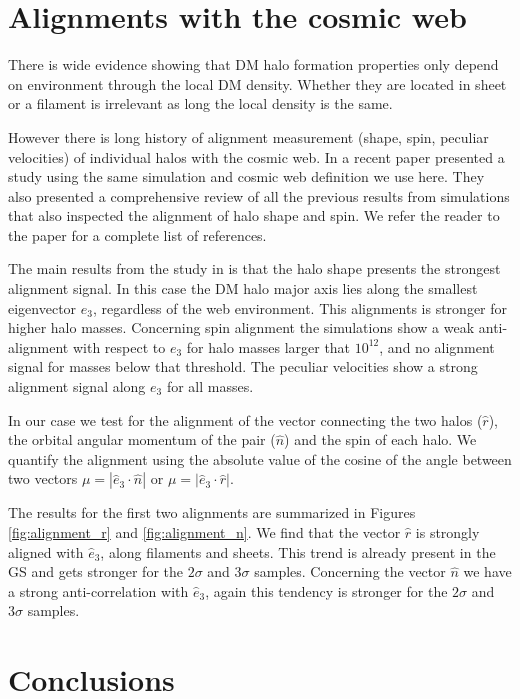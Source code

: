\documentclass{iau}
\newcommand{\Msun}{{\ifmmode{{\rm {M_{\odot}}}}\else{${\rm{M_{\odot}}}$}\fi}}
\begin{document}
\section{Alignments with the cosmic web}

There is wide evidence showing that DM halo formation properties only
depend on environment through the local DM density. Whether they are
located in sheet or a filament is irrelevant as long the local density
is the same. 

However there is long history of alignment measurement (shape, spin,
peculiar velocities) of individual halos with the cosmic web. In a
recent paper \cite{ForeroRomero2014} presented a study
using the same simulation and cosmic web definition we use here.
They also presented a comprehensive review of all the previous results
from simulations that also inspected the alignment of halo shape and
spin. We refer the reader to the paper for a complete list of
references. 

The main results from the study in \cite{ForeroRomero2014} is that the
halo shape presents the strongest alignment signal. In this case the
DM halo major axis lies along the smallest eigenvector $e_{3}$,
regardless of the web environment. This alignments is stronger for
higher halo masses. Concerning spin alignment the simulations show a
weak anti-alignment with respect to $e_{3}$ for halo masses larger
that $10^{12}$\Msun, and no alignment signal for masses below that
threshold. The peculiar velocities show a strong alignment signal
along $e_{3}$ for all masses. 


In our case we test for the alignment of the vector connecting the two
halos ($\hat{r}$), the orbital angular momentum of the pair
($\hat{n}$) and the spin of each
halo. We quantify the alignment using the absolute value of the cosine of
the angle between two vectors $\mu=|\hat{e}_3 \cdot \hat{n}|$ or
$\mu=|\hat{e}_3\cdot \hat{r}|$.

The results for the first two alignments are summarized in Figures
\ref{fig:alignment_r} and \ref{fig:alignment_n}.  We find that the
vector $\hat{r}$ is strongly aligned with $\hat{e}_{3}$, along
filaments and sheets. This trend is already present in the GS and gets
stronger for the $2\sigma$ and $3\sigma$ samples. Concerning the
vector $\hat{n}$ we have a strong anti-correlation  with $\hat{e}_3$,
again this tendency is stronger for the $2\sigma$ and $3\sigma$
samples. 


\section{Conclusions}
\end{document}
